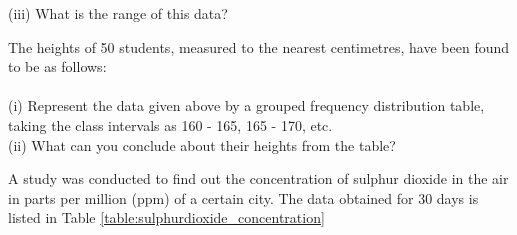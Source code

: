 (iii) What is the range of this data?\\
\item The heights of 50 students, measured to the nearest centimetres, have been found to be as follows:\\
\\

(i) Represent the data given above by a grouped frequency distribution table, taking the class intervals as 160 - 165, 165 - 170, etc.\\
(ii) What can you conclude about their heights from the table?\\
\item 
A study was conducted to find out the concentration of sulphur dioxide in the air in parts per million (ppm) of a certain city. The data obtained for 30 days is listed in Table \ref{table:sulphurdioxide_concentration}

